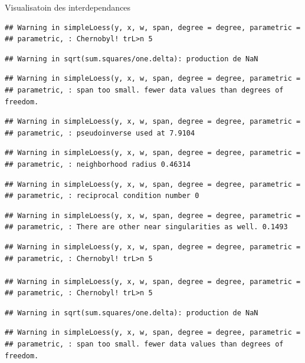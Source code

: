\documentclass[11pt,ignorenonframetext,]{beamer}
\begin{document}
\begin{frame}[fragile]{Visualisatoin des interdependances}
\begin{verbatim}
## Warning in simpleLoess(y, x, w, span, degree = degree, parametric =
## parametric, : Chernobyl! trL>n 5
\end{verbatim}

\begin{verbatim}
## Warning in sqrt(sum.squares/one.delta): production de NaN
\end{verbatim}

\begin{verbatim}
## Warning in simpleLoess(y, x, w, span, degree = degree, parametric =
## parametric, : span too small. fewer data values than degrees of freedom.
\end{verbatim}

\begin{verbatim}
## Warning in simpleLoess(y, x, w, span, degree = degree, parametric =
## parametric, : pseudoinverse used at 7.9104
\end{verbatim}

\begin{verbatim}
## Warning in simpleLoess(y, x, w, span, degree = degree, parametric =
## parametric, : neighborhood radius 0.46314
\end{verbatim}

\begin{verbatim}
## Warning in simpleLoess(y, x, w, span, degree = degree, parametric =
## parametric, : reciprocal condition number 0
\end{verbatim}

\begin{verbatim}
## Warning in simpleLoess(y, x, w, span, degree = degree, parametric =
## parametric, : There are other near singularities as well. 0.1493
\end{verbatim}

\begin{verbatim}
## Warning in simpleLoess(y, x, w, span, degree = degree, parametric =
## parametric, : Chernobyl! trL>n 5

## Warning in simpleLoess(y, x, w, span, degree = degree, parametric =
## parametric, : Chernobyl! trL>n 5
\end{verbatim}

\begin{verbatim}
## Warning in sqrt(sum.squares/one.delta): production de NaN
\end{verbatim}

\begin{verbatim}
## Warning in simpleLoess(y, x, w, span, degree = degree, parametric =
## parametric, : span too small. fewer data values than degrees of freedom.
\end{verbatim}


\end{frame}
\end{document}
